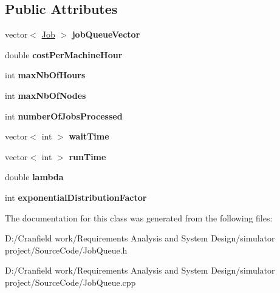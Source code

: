 \subsection*{Public Attributes}
\begin{DoxyCompactItemize}
\item 
\mbox{\label{class_job_queue_a2df2ae8313ca2248d59f68158fa64de5}} 
vector$<$ \mbox{\hyperlink{class_job}{Job}} $>$ {\bfseries job\+Queue\+Vector}
\item 
\mbox{\label{class_job_queue_abcf8363998ac230e81b6e84d13a0da05}} 
double {\bfseries cost\+Per\+Machine\+Hour}
\item 
\mbox{\label{class_job_queue_aa14e93d8289f0cbffdd1e7fdb5991e00}} 
int {\bfseries max\+Nb\+Of\+Hours}
\item 
\mbox{\label{class_job_queue_aec23b24c5671b66aeb8bcb619f390ab9}} 
int {\bfseries max\+Nb\+Of\+Nodes}
\item 
\mbox{\label{class_job_queue_aee18b3b19b0faf073e1399a3725d92f7}} 
int {\bfseries number\+Of\+Jobs\+Processed}
\item 
\mbox{\label{class_job_queue_acc66a3f47ac7bbec772f0c5ea5d699c3}} 
vector$<$ int $>$ {\bfseries wait\+Time}
\item 
\mbox{\label{class_job_queue_a3a9b97d1a3b1ee0da81747335a0a5d25}} 
vector$<$ int $>$ {\bfseries run\+Time}
\item 
\mbox{\label{class_job_queue_ab6876a626f1767a5bb7e63a65ce1faef}} 
double {\bfseries lambda}
\item 
\mbox{\label{class_job_queue_a2b9e866b703b97a2fcec2ef289a1f00a}} 
int {\bfseries exponential\+Distribution\+Factor}
\end{DoxyCompactItemize}


The documentation for this class was generated from the following files\+:\begin{DoxyCompactItemize}
\item 
D\+:/\+Cranfield work/\+Requirements Analysis and System Design/simulator project/\+Source\+Code/Job\+Queue.\+h\item 
D\+:/\+Cranfield work/\+Requirements Analysis and System Design/simulator project/\+Source\+Code/Job\+Queue.\+cpp\end{DoxyCompactItemize}
